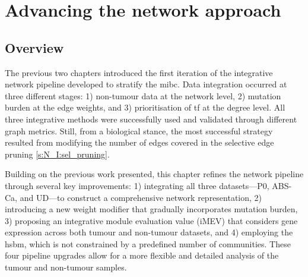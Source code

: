 
\chapter{Advancing the network approach} \label{s:N_II}


\vspace{3mm}
\vspace{3mm}


\section{Overview}

The previous two chapters introduced the first iteration of the integrative network pipeline developed to stratify the \acrfull{mibc}. Data integration occurred at three different stages: 1) non-tumour data at the network level, 2) mutation burden at the edge weights, and 3) prioritisation of \acrfull{tf} at the degree level. All three integrative methods were successfully used and validated through different graph metrics. Still, from a biological stance, the most successful strategy resulted from modifying the number of edges covered in the selective edge pruning \cref{s:N_I:sel_pruning}.


Building on the previous work presented, this chapter refines the network pipeline through several key improvements: 1) integrating all three datasets—P0, ABS-Ca, and UD—to construct a comprehensive network representation, 2) introducing a new weight modifier that gradually incorporates mutation burden, 3) proposing an integrative module evaluation value (iMEV) that considers gene expression across both tumour and non-tumour datasets, and 4) employing the \acrfull{hsbm}, which is not constrained by a predefined number of communities. These four pipeline upgrades allow for a more flexible and detailed analysis of the tumour and non-tumour samples.


